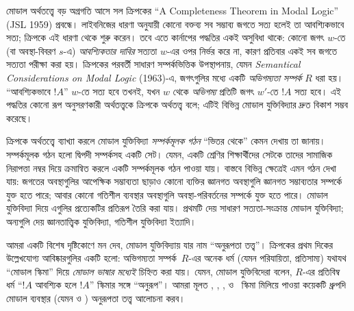 \documentclass[../../../include/open-logic-section]{subfiles}
\begin{document}
মোডাল অর্থতত্ত্বে বড় অগ্রগতি আসে সল ক্রিপকের ``A Completeness Theorem
in Modal Logic'' (JSL 1959) প্রবন্ধে। লাইবনিজের ধারণা অনুযায়ী কোনো
বক্তব্য সব সম্ভাব্য জগতে সত্য হলেই তা আবশ্যিকভাবে সত্য; ক্রিপকে এই ধারণা
থেকে শুরু করেন। তবে এতে কার্নাপের পদ্ধতির একই অসুবিধা থাকে: কোনো
জগৎ $w$-তে (বা অবস্থা-বিবরণ $s$-এ) \emph{আবশ্যিকতার দাবির} সত্যতা
$w$-এর ওপর নির্ভর করে না, কারণ প্রতিবার একই সব জগতে সত্যতা পরীক্ষা করা হয়।
ক্রিপকের পরবর্তী সাধারণ সম্পর্কভিত্তিক উপস্থাপনায়, যেমন
\emph{Semantical Considerations on Modal Logic} (1963)-এ, জগৎগুলির মধ্যে
একটি \emph{অভিগম্যতা সম্পর্ক} $R$ ধরা হয়। ``আবশ্যিকভাবে $!A$'' $w$-তে সত্য হবে তখনই,
যখন $w$ থেকে \emph{অভিগম্য} প্রতিটি জগৎ $w'$-তে $!A$ সত্য হবে।
এই পদ্ধতির কোনো রূপ অনুসরণকারী অর্থতত্ত্বকে ক্রিপকে অর্থতত্ত্ব বলে;
এটিই বিভিন্ন মোডাল যুক্তিবিদ্যার দ্রুত বিকাশ সম্ভব করেছে।

ক্রিপকে অর্থতত্ত্বে ব্যাখ্যা করলে মোডাল যুক্তিবিদ্যা \emph{সম্পর্কমূলক
গঠন} ``ভিতর থেকে'' কেমন দেখায় তা জানায়। সম্পর্কমূলক গঠন হলো
দ্বিপদী সম্পর্কসহ একটি সেট। যেমন, একটি শ্রেণির শিক্ষার্থীদের সেটকে
তাদের সামাজিক নিরাপত্তা নম্বর দিয়ে ক্রমান্বিত করলে একটি সম্পর্কমূলক গঠন
পাওয়া যায়। বাস্তবে বিভিন্ন ক্ষেত্রেই এমন গঠন দেখা যায়: জগতের
অবস্থাগুলির আপেক্ষিক সম্ভাব্যতা ছাড়াও কোনো ব্যক্তির জ্ঞানগত অবস্থাগুলি
জ্ঞানগত সম্ভাব্যতার সম্পর্কে যুক্ত হতে পারে; আবার কোনো গতিশীল ব্যবস্থার
অবস্থাগুলি অবস্থা-পরিবর্তনের সম্পর্কে যুক্ত হতে পারে। মোডাল যুক্তিবিদ্যা
দিয়ে এগুলির প্রত্যেকটির প্রতিরূপ তৈরি করা যায়। প্রথমটি দেয় সাধারণ
সত্যতা-সংক্রান্ত মোডাল যুক্তিবিদ্যা; অন্যগুলি দেয় জ্ঞানতাত্ত্বিক
যুক্তিবিদ্যা, গতিশীল যুক্তিবিদ্যা ইত্যাদি।

আমরা একটি বিশেষ দৃষ্টিকোণে মন দেব, মোডাল যুক্তিবিদ্যায় যার নাম
``অনুরূপতা তত্ত্ব''। ক্রিপকের প্রথম দিকের উল্লেখযোগ্য আবিষ্কারগুলির
একটি হলো: অভিগম্যতা সম্পর্ক~$R$-এর অনেক ধর্ম (যেমন পরিযায়িতা,
প্রতিসাম্য) যথাযথ ``মোডাল স্কিমা'' দিয়ে \emph{মোডাল ভাষার মধ্যেই}
চিহ্নিত করা যায়। যেমন, মোডাল যুক্তিবিদেরা বলেন, $R$-এর প্রতিবিম্ব ধর্ম
``$!A$ আবশ্যিক হলে $!A$'' স্কিমার সঙ্গে ``অনুরূপ''। আমরা মূলত
, , ,  ও~ স্কিমা মিলিয়ে পাওয়া
কয়েকটি ধ্রুপদি মোডাল ব্যবস্থার (যেমন  ও )
অনুরূপতা তত্ত্ব আলোচনা করব।
\end{document}
